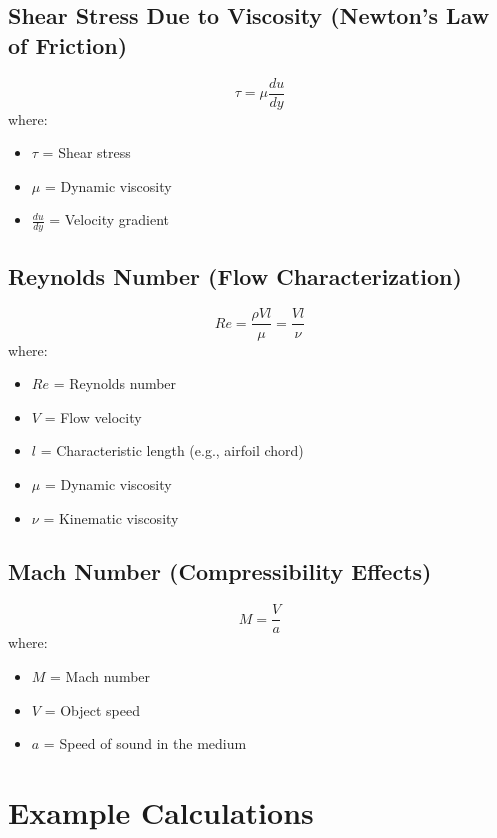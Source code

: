 \documentclass{article}
\begin{document}
\subsection{Shear Stress Due to Viscosity (Newton’s Law of Friction)}
\begin{equation}
    \tau = \mu \frac{du}{dy}
\end{equation}
where:
\begin{itemize}
    \item $\tau$ = Shear stress
    \item $\mu$ = Dynamic viscosity
    \item $\frac{du}{dy}$ = Velocity gradient
\end{itemize}

\subsection{Reynolds Number (Flow Characterization)}
\begin{equation}
    Re = \frac{\rho V l}{\mu} = \frac{V l}{\nu}
\end{equation}
where:
\begin{itemize}
    \item $Re$ = Reynolds number
    \item $V$ = Flow velocity
    \item $l$ = Characteristic length (e.g., airfoil chord)
    \item $\mu$ = Dynamic viscosity
    \item $\nu$ = Kinematic viscosity
\end{itemize}

\subsection{Mach Number (Compressibility Effects)}
\begin{equation}
    M = \frac{V}{a}
\end{equation}
where:
\begin{itemize}
    \item $M$ = Mach number
    \item $V$ = Object speed
    \item $a$ = Speed of sound in the medium
\end{itemize}

\section{Example Calculations}
\end{document}
